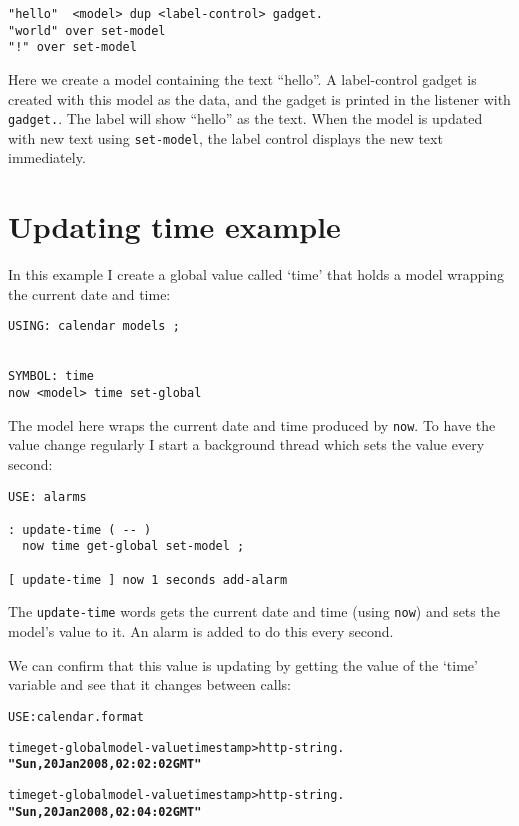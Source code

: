 \begin{verbatim}
"hello"  <model> dup <label-control> gadget.
"world" over set-model
"!" over set-model
\end{verbatim}

Here we create a model containing the text ``hello''. A label-control gadget is created with this model as the data, and the gadget is printed in the listener with \verb|gadget.|. The label will show ``hello'' as the text. When the model is updated with new text using \verb|set-model|, the label control displays the new text immediately.

\section{Updating time example}

In this example I create a global value called `time' that holds a
model wrapping the current date and time:

\begin{verbatim}
USING: calendar models ;


SYMBOL: time
now <model> time set-global
\end{verbatim}

The model here wraps the current date and time produced by
\verb|now|. To have the value change regularly I start a background
thread which sets the value every second:

\begin{verbatim}
USE: alarms

: update-time ( -- )
  now time get-global set-model ;

[ update-time ] now 1 seconds add-alarm
\end{verbatim}

The \verb|update-time| words gets the current date and time (using \verb|now|)
and sets the model's value to it. An alarm is added to do this every second.

We can confirm that this value is updating by getting the value of
the `time' variable and see that it changes between calls:

\begin{alltt}
USE: calendar.format

time get-global model-value timestamp>http-string .
  \textbf{"Sun, 20 Jan 2008, 02:02:02 GMT"} 

time get-global model-value timestamp>http-string .
  \textbf{"Sun, 20 Jan 2008, 02:04:02 GMT" }
\end{alltt}

